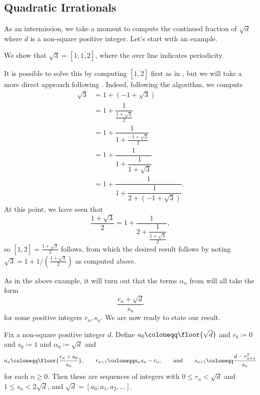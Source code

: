 \documentclass[../notes.tex]{subfiles}
\begin{document}
\subsection{Quadratic Irrationals}
As an intermission, we take a moment to compute the continued fraction of $\sqrt d$ where $d$ is a non-square positive integer. Let's start with an example.
\begin{example}
	We show that $\sqrt3=[1;\overline{1,2}]$, where the over line indicates periodicity.
\end{example}
\begin{solution}
	It is possible to solve this by computing $[\overline{1,2}]$ first as in , but we will take a more direct approach following . Indeed, following the algorithm, we compute
	\begin{align*}
		\sqrt3 &= 1+\left(-1+\sqrt3\right) \\
		&= 1+\dfrac1{\frac{1+\sqrt3}2} \\
		&= 1+\dfrac1{1+\frac{-1+\sqrt3}2} \\
		&= 1+\dfrac1{1+\dfrac1{1+\sqrt3}} \\
		&= 1+\dfrac1{1+\dfrac1{2+\left(-1+\sqrt3\right)}}.
	\end{align*}
	At this point, we have seen that
	\[\frac{1+\sqrt3}2=1+\dfrac1{2+\dfrac1{\frac{1+\sqrt3}2}},\]
	so $[\overline{1,2}]=\frac{1+\sqrt3}2$ follows, from which the desired result follows by noting $\sqrt3=1+1/\left(\frac{1+\sqrt3}2\right)$ as computed above.
\end{solution}
As in the above example, it will turn out that the terms $\alpha_n$ from  will all take the form
\[\frac{r_n+\sqrt d}{s_n}\]
for some positive integers $r_n,s_n$. We are now ready to state our result.
\begin{proposition} \label{prop:cf-sqrt-d}
	Fix a non-square positive integer $d$. Define $a_0\coloneqq\floor{\sqrt d}$ and $r_0\coloneqq0$ and $s_0\coloneqq1$ and $\alpha_0\coloneqq\sqrt d$ and
	\[a_n\coloneqq\floor{\frac{r_n+a_0}{s_n}},\qquad r_{n+1}\coloneqq a_ns_n-r_n,\qquad\text{and}\qquad s_{n+1}\coloneqq\frac{d-r_{n+1}^2}{s_n}\]
	for each $n\ge0$. Then these are sequences of integers with $0\le r_n<\sqrt d$ and $1\le s_n<2\sqrt d$, and $\sqrt d=[a_0;a_1,a_2,\ldots]$.
\end{proposition}
\end{document}
